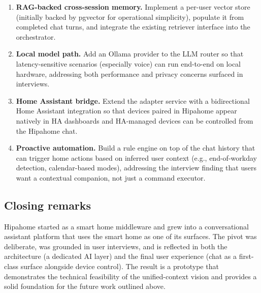 \documentclass[a4paper,12pt]{article}
\begin{document}
\begin{enumerate}
  \item \textbf{RAG-backed cross-session memory.} Implement a per-user vector store (initially backed by pgvector for operational simplicity), populate it from completed chat turns, and integrate the existing retriever interface into the orchestrator.
  \item \textbf{Local model path.} Add an Ollama provider to the LLM router so that latency-sensitive scenarios (especially voice) can run end-to-end on local hardware, addressing both performance and privacy concerns surfaced in interviews.
  \item \textbf{Home Assistant bridge.} Extend the adapter service with a bidirectional Home Assistant integration so that devices paired in Hipahome appear natively in HA dashboards and HA-managed devices can be controlled from the Hipahome chat.
  \item \textbf{Proactive automation.} Build a rule engine on top of the chat history that can trigger home actions based on inferred user context (e.g., end-of-workday detection, calendar-based modes), addressing the interview finding that users want a contextual companion, not just a command executor.
\end{enumerate}

\subsection{Closing remarks}

Hipahome started as a smart home middleware and grew into a conversational assistant platform that uses the smart home as one of its surfaces. The pivot was deliberate, was grounded in user interviews, and is reflected in both the architecture (a dedicated AI layer) and the final user experience (chat as a first-class surface alongside device control). The result is a prototype that demonstrates the technical feasibility of the unified-context vision and provides a solid foundation for the future work outlined above.

\newpage
\end{document}
